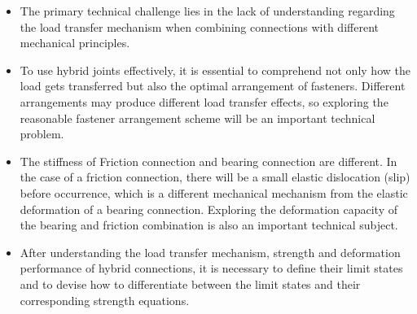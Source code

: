 \begin{itemize}
    \item The primary technical challenge lies in the lack of understanding regarding the load transfer mechanism when combining connections with different mechanical principles.
    \item To use hybrid joints effectively, it is essential to comprehend not only how the load gets transferred but also the optimal arrangement of fasteners. Different arrangements may produce different load transfer effects, so exploring the reasonable fastener arrangement scheme will be an important technical problem.
    \item The stiffness of Friction connection and bearing connection are different. In the case of a friction connection, there will be a small elastic dislocation (slip) before occurrence, which is a different mechanical mechanism from the elastic deformation of a bearing connection. Exploring the deformation capacity of the bearing and friction combination is also an important technical subject.
    \item After understanding the load transfer mechanism, strength and deformation performance of hybrid connections, it is necessary to define their limit states and to devise how to differentiate between the limit states and their corresponding strength equations.
    
\end{itemize}



